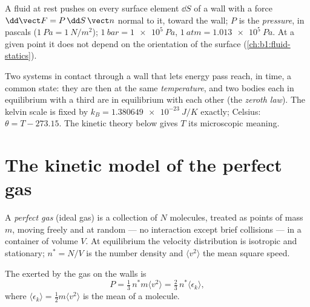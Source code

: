 \begin{definition}[Pressure]\label{def:b1:kinetic-theory:pressure}
A fluid at rest pushes on every surface element $\dd S$ of a wall with a
force $\dd\vect F = P\,\dd S\,\vect n$ normal to it, toward the wall; $P$ is
the \emph{pressure}, in pascals ($\qty{1}{Pa} = \qty{1}{N/m^2}$); $\qty{1}{bar}
= \qty{1e5}{Pa}$, $\qty{1}{atm} = \qty{1.013e5}{Pa}$. At a given point it does
not depend on the orientation of the surface (\cref{ch:b1:fluid-statics}).
\end{definition}

\begin{definition}[Temperature]\label{def:b1:kinetic-theory:temperature}
Two systems in contact through a wall that lets energy pass reach, in
time, a common state: they are then at the same \emph{temperature}, and
two bodies each in equilibrium with a third are in equilibrium with
each other (the \emph{zeroth law}). The kelvin scale is fixed by
$k_B = \qty{1.380649e-23}{J/K}$ exactly; Celsius: $\theta = T - 273.15$. The
kinetic theory below gives $T$ its microscopic meaning.
\end{definition}

\section{The kinetic model of the perfect gas}

\begin{definition}\label{def:b1:kinetic-theory:model}
A \emph{perfect gas} (ideal gas) is a collection of $N$ molecules,
treated as points of mass $m$, moving freely and at random --- no
interaction except brief collisions --- in a container of volume $V$.
At equilibrium the velocity distribution is isotropic and stationary;
$n^* = N/V$ is the number density and $\langle v^2\rangle$ the mean square
speed.
\end{definition}

\begin{theorem}\label{thm:b1:kinetic-theory:pressure}
The  exerted by the gas on the walls is
\[
P = \tfrac13\,n^*m\langle v^2\rangle = \tfrac23\,n^*\langle\epsilon_k\rangle ,
\]
where $\langle\epsilon_k\rangle = \tfrac12 m\langle v^2\rangle$ is the mean
 of a molecule.
\end{theorem}

